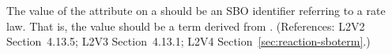 The value of the  attribute on a \KineticLaw should be an SBO
identifier referring to a rate law.  That is, the value should be a term
derived from \sboratelaw.  (References: L2V2 Section~4.13.5; L2V3
Section~4.13.1; L2V4 Section~\ref{sec:reaction-sboterm}.)
